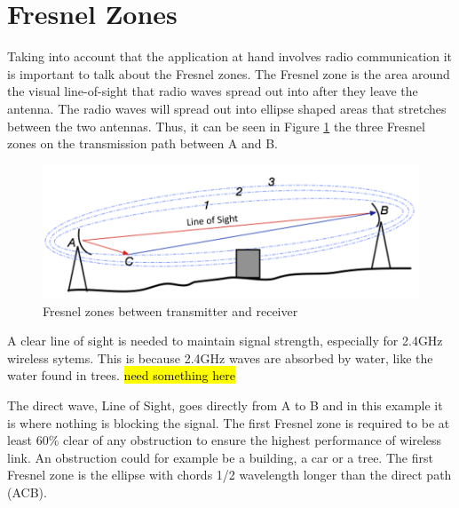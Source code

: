 \newpage

\section{Fresnel Zones}\label{sec:fresnel}
Taking into account that the application at hand involves radio communication it is important to talk about the Fresnel zones. The Fresnel zone is the area around the visual line-of-sight that radio waves spread out into after they leave the antenna. The radio waves will spread out into ellipse shaped areas that stretches between the two antennas. Thus, it can be seen in Figure \ref{fig:fresnel_zones} the three Fresnel zones on the transmission path between A and B. 

\begin{figure}[h]
	\centering
	\includegraphics[scale=0.65]{figures/fresnel_zones.png}
	\caption{Fresnel zones between transmitter and receiver}
	\label{fig:fresnel_zones}
\end{figure}

A clear line of sight is needed to maintain signal strength, especially for 2.4GHz wireless sytems. This is because 2.4GHz waves are absorbed by water, like the water found in trees. \hl{need something here}

The direct wave, Line of Sight, goes directly from A to B and in this example it is where nothing is blocking the signal. The first Fresnel zone is required to be at least 60$\%$ clear of any obstruction to ensure the highest performance of wireless link. An obstruction could for example be a building, a car or a tree. The first Fresnel zone is the ellipse with chords 1/2 wavelength longer than the direct path (ACB). 

